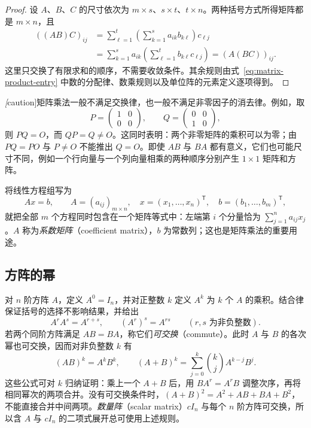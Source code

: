 \begin{proof}
设 $A$、$B$、$C$ 的尺寸依次为 $m\times s$、$s\times t$、$t\times n$。两种括号方式所得矩阵都是 $m\times n$，且
\[
    \begin{aligned}
        ((AB)C)_{ij}
        &=\sum_{\ell=1}^{t}\left(\sum_{k=1}^{s}a_{ik}b_{k\ell}\right)c_{\ell j}\\
        &=\sum_{k=1}^{s}a_{ik}\left(\sum_{\ell=1}^{t}b_{k\ell}c_{\ell j}\right)
        =(A(BC))_{ij}.
    \end{aligned}
\]
这里只交换了有限求和的顺序，不需要收敛条件。其余规则由式~\eqref{eq:matrix-product-entry} 中数的分配律、数乘规则以及单位阵的元素定义逐项得到。
\end{proof}

\emph[caution]{矩阵乘法一般不满足交换律，也一般不满足非零因子的消去律。}例如，取
\[
    P=\begin{pmatrix}1&0\\0&0\end{pmatrix},\qquad
    Q=\begin{pmatrix}0&0\\1&0\end{pmatrix},
\]
则 $PQ=O$，而 $QP=Q\ne O$。这同时表明：两个非零矩阵的乘积可以为零；由 $PQ=PO$ 与 $P\ne O$ 不能推出 $Q=O$。即使 $AB$ 与 $BA$ 都有意义，它们也可能尺寸不同，例如一个行向量与一个列向量相乘的两种顺序分别产生 $1\times1$ 矩阵和方阵。

将线性方程组写为
\begin{equation}
\label{eq:matrix-linear-system}
    Ax=b,\qquad
    A=(a_{ij})_{m\times n},\quad
    x=(x_1,\ldots,x_n)^{\mathsf T},\quad
    b=(b_1,\ldots,b_m)^{\mathsf T},
\end{equation}
就把全部 $m$ 个方程同时包含在一个矩阵等式中：左端第 $i$ 个分量恰为 $\sum_{j=1}^{n}a_{ij}x_j$。$A$ 称为\emph{系数矩阵}（coefficient matrix），$b$ 为常数列；这也是矩阵乘法的重要用途。

\subsection{方阵的幂}

对 $n$ 阶方阵 $A$，定义 $A^0=I_n$，并对正整数 $k$ 定义 $A^k$ 为 $k$ 个 $A$ 的乘积。结合律保证括号的选择不影响结果，并给出
\[
    A^rA^s=A^{r+s},\qquad (A^r)^s=A^{rs}
    \qquad(r,s\text{ 为非负整数}).
\]
若两个同阶方阵满足 $AB=BA$，称它们\emph{可交换}（commute）。此时 $A$ 与 $B$ 的各次幂也可交换，因而对非负整数 $k$ 有
\begin{equation}
\label{eq:matrix-commuting-binomial}
    (AB)^k=A^kB^k,\qquad
    (A+B)^k=\sum_{j=0}^{k}\binom{k}{j}A^{k-j}B^j.
\end{equation}
这些公式可对 $k$ 归纳证明：乘上一个 $A+B$ 后，用 $BA^r=A^rB$ 调整次序，再将相同幂次的两项合并。没有可交换条件时，$(A+B)^2=A^2+AB+BA+B^2$，不能直接合并中间两项。\emph{数量阵}（scalar matrix）$cI_n$ 与每个 $n$ 阶方阵可交换，所以含 $A$ 与 $cI_n$ 的二项式展开总可使用上述规则。

